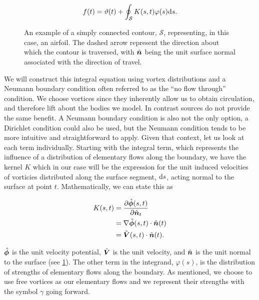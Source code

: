 \begin{equation}
    \label{eqn:fredholm1}
    f(t) = \vartheta(t) + \oint_\mathcal{S} K(s,t) \varphi(s) \mathrm{d} s.
\end{equation}

\begin{figure}[h!]
    \centering
        
        \caption[An airfoil as a simply connected contour.]{An example of a simply connected contour, \(\mathcal{S}\), representing, in this case, an airfoil. The dashed arrow represent the direction about which the contour is traversed, with \(\hat{\bm{n}}\) being the unit surface normal associated with the direction of travel.}
    \label{fig:simplyconnectedairfoil}
\end{figure}

We will construct this integral equation using vortex distributions and a Neumann boundary condition often referred to as the ``no flow through'' condition.
%
We choose vortices since they inherently allow us to obtain circulation, and therefore lift about the bodies we model.
%
In contrast sources do not provide the same benefit.
%
A Neumann boundary condition is also not the only option, a Dirichlet condition could also be used, but the Neumann condition tends to be more intuitive and straightforward to apply.
%
Given that context, let us look at each term individually.
%
Starting with the integral term, which represents the influence of a distribution of elementary flows along the boundary, we have the kernel \(K\) which in our case will be the expression for the unit induced velocities of vorticies distributed along the surface segment, \(\mathrm{d} s\), acting normal to the surface at point \(t\).
%
Mathematically, we can state this as

\begin{equation}
    \begin{aligned}
        K(s,t) &= \frac{\partial \hat{\bm{\phi}}(s,t)}{\partial \hat{\bm{n}}_t} \\
               &= \nabla \hat{\bm{\phi}}(s,t) \cdot \hat{\bm{n}}(t) \\
               &= \hat{\bm{V}}(s,t) \cdot \hat{\bm{n}}(t).
    \end{aligned}
\end{equation}

\where \(\hat{\bm{\phi}}\) is the unit velocity potential, \(\hat{\bm{V}}\) is the unit velocity, and \(\hat{\bm{n}}\) is the unit normal to the surface (see \cref{fig:simplyconnectedairfoil}).
%
The other term in the integrand, \(\varphi(s)\), is the distribution of strengths of elementary flows along the boundary.
%
As mentioned, we choose to use free vortices as our elementary flows and we represent their strengths with the symbol \(\gamma\) going forward.
%

